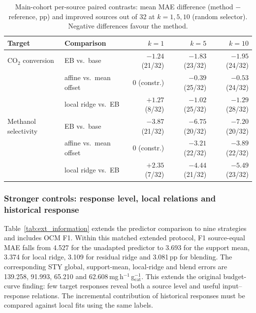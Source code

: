 \documentclass[11pt,a4paper]{article}
\newcommand{\pp}{\,pp}
\newcommand{\mgg}{\,mg\,h$^{-1}$\,g$_{\mathrm{cat}}^{-1}$}
\begin{document}
\begin{table}[t]
\centering\small
\caption{Main-cohort per-source paired contrasts: mean MAE difference (method $-$
reference, pp) and improved sources out of 32 at $k=1,5,10$ (random selector).
Negative differences favour the method.}
\label{tab:paired}
\begin{tabular}{llrrr}
\toprule
Target & Comparison & $k=1$ & $k=5$ & $k=10$ \\
\midrule
CO$_2$ conversion & EB vs.\ base & $-1.24$ (21/32) & $-1.83$ (23/32) & $-1.95$ (24/32) \\
 & affine vs.\ mean offset & 0 (constr.) & $-0.39$ (25/32) & $-0.53$ (24/32) \\
 & local ridge vs.\ EB & $+1.27$ (8/32) & $-1.02$ (25/32) & $-1.29$ (28/32) \\
\midrule
Methanol selectivity & EB vs.\ base & $-3.87$ (21/32) & $-6.75$ (20/32) & $-7.20$ (20/32) \\
 & affine vs.\ mean offset & 0 (constr.) & $-3.21$ (22/32) & $-3.89$ (22/32) \\
 & local ridge vs.\ EB & $+2.35$ (7/32) & $-4.44$ (21/32) & $-5.49$ (23/32) \\
\bottomrule
\end{tabular}
\end{table}


\subsubsection{Stronger controls: response level, local relations and historical response}
Table~\ref{tab:ext_information} extends the predictor comparison to nine strategies and includes OCM F1.
Within this matched extended protocol, F1 source-equal MAE falls from 4.527 for the unadapted predictor to 3.693 for the support mean, 3.374 for local ridge, 3.109 for residual ridge and 3.081\pp{} for blending.
The corresponding STY global, support-mean, local-ridge and blend errors are 139.258, 91.993, 65.210 and 62.608\mgg{}.
This extends the original budget-curve finding: few target responses reveal both a source level and useful input--response relations.
The incremental contribution of historical responses must be compared against local fits using the same labels.
\begin{table}[htbp]\centering\footnotesize
\setlength{\tabcolsep}{4pt}
\caption{Extended information controls with five random support labels. Each panel shares support/query records. Frozen fits and support orders belong to this analysis layer, separately from the core benchmark in Table~\ref{tab:k5}; gains are not computed across tables. STY uses native units; other responses use percentage points.}\label{tab:ext_information}

\end{table}
\end{document}
